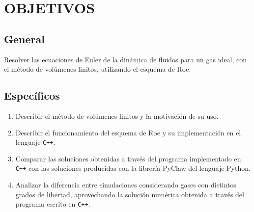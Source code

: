\chapter{OBJETIVOS}

\section*{General}
Resolver las ecuaciones de Euler de la dinámica de fluidos para un gas ideal, con el método de volúmenes finitos, utilizando el esquema de Roe.


\section*{Específicos}

\begin{enumerate}
\item Describir el método de volúmenes finitos y la motivación de su uso. 
\item Describir el funcionamiento del esquema de Roe y su implementación en el lenguaje \texttt{C++}.
\item Comparar las soluciones obtenidas a través del programa implementado en \texttt{C++} con las soluciones producidas con la librería PyClaw del lenguaje Python.
\item Analizar la diferencia entre simulaciones considerando gases con distintos grados de libertad, aprovechando la solución numérica obtenida a través del programa escrito en \texttt{C++}.
\end{enumerate}

